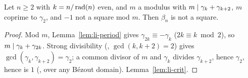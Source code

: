 \begin{proposition}
  \label{lem:li-even}
  \leanok
  Let $n \ge 2$ with $k = n/\operatorname{rad}(n)$ even, and $m$ a modulus with $m \mathrel{\mid} \gamma_k + \gamma_{k+2}$,
  $m$ coprime to $\gamma_2$, and $-1$ not a square mod $m$. Then $\beta_n$ is not a square.
\end{proposition}
\begin{proof}
  \leanok
  Mod $m$, Lemma~\ref{lem:li-period} gives $\gamma_{2k} \equiv -\gamma_k$ ($2k \equiv k \bmod 2$),
  so $m \mathrel{\mid} \gamma_k + \gamma_{2k}$. Strong divisibility (,
  $\gcd(k, k+2) = 2$) gives $\gcd(\gamma_k, \gamma_{k+2}) = \gamma_2$; a common divisor of $m$
  and $\gamma_k$ divides $\gamma_{k+2}$, hence $\gamma_2$, hence is $1$
  (, over any Bézout domain).
  Lemma~\ref{lem:li-crit}.
\end{proof}


